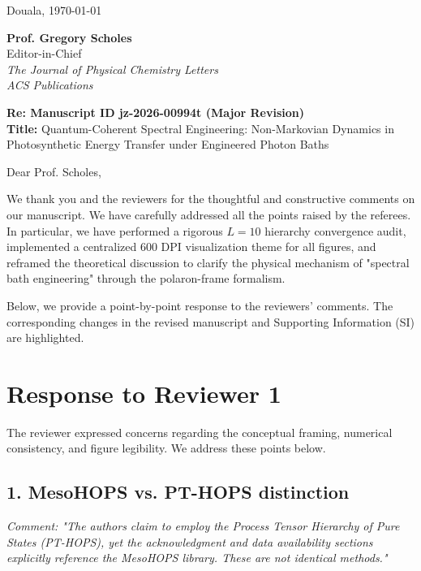 \documentclass[11pt]{article}
\begin{document}
\begin{flushright}
    Douala, \today
\end{flushright}

\noindent \textbf{Prof. Gregory Scholes}\\
Editor-in-Chief\\
\textit{The Journal of Physical Chemistry Letters}\\
\textit{ACS Publications}

\vspace{1em}

\noindent \textbf{Re: Manuscript ID jz-2026-00994t (Major Revision)}\\
\textbf{Title:} Quantum-Coherent Spectral Engineering: Non-Markovian Dynamics in Photosynthetic Energy Transfer under Engineered Photon Baths

\vspace{2em}

\noindent Dear Prof. Scholes,

\vspace{1.5em}

We thank you and the reviewers for the thoughtful and constructive comments on our manuscript. We have carefully addressed all the points raised by the referees. In particular, we have performed a rigorous $L=10$ hierarchy convergence audit, implemented a centralized 600 DPI visualization theme for all figures, and reframed the theoretical discussion to clarify the physical mechanism of "spectral bath engineering" through the polaron-frame formalism.

Below, we provide a point-by-point response to the reviewers' comments. The corresponding changes in the revised manuscript and Supporting Information (SI) are highlighted.

\vspace{2em}

\section*{Response to Reviewer 1}

The reviewer expressed concerns regarding the conceptual framing, numerical consistency, and figure legibility. We address these points below.

\subsection*{1. MesoHOPS vs. PT-HOPS distinction}
\textit{Comment: "The authors claim to employ the Process Tensor Hierarchy of Pure States (PT-HOPS), yet the acknowledgment and data availability sections explicitly reference the MesoHOPS library. These are not identical methods."}
\end{document}
